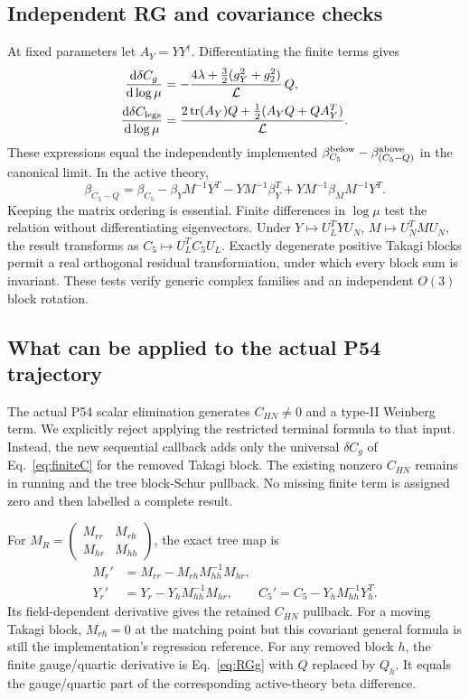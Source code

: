 \documentclass[11pt]{article}
\newcommand{\tr}{\operatorname{tr}}
\newcommand{\dd}{\mathrm d}
\newcommand{\LOOP}{\mathcal L}
\begin{document}
\subsection{Independent RG and covariance checks}
At fixed parameters let $A_Y=YY^\dagger$. Differentiating the finite
terms gives
\begin{align}
 \frac{\dd\delta C_g}{\dd\log\mu}
 &=-\frac{4\lambda+\tfrac32(g_Y^2+g_2^2)}{\LOOP}\,Q,\label{eq:RGg}\\
 \frac{\dd\delta C_{\rm legs}}{\dd\log\mu}
 &=\frac{2\tr(A_Y)Q+\tfrac12(A_YQ+QA_Y^T)}{\LOOP}.
 \label{eq:RGchecks}
\end{align}
These expressions equal the independently implemented
$\beta_{C_5}^{\rm below}-\beta_{(C_5-Q)}^{\rm above}$ in the canonical
limit. In the active theory,
\begin{equation}
 \beta_{C_5-Q}=\beta_{C_5}-\beta_YM^{-1}Y^T-YM^{-1}\beta_Y^T
                    +YM^{-1}\beta_M M^{-1}Y^T.
\end{equation}
Keeping the matrix ordering is essential. Finite differences in
$\log\mu$ test the relation without differentiating eigenvectors.
Under $Y\mapsto U_L^TYU_N$, $M\mapsto U_N^TMU_N$, the result transforms
as $C_5\mapsto U_L^TC_5U_L$. Exactly degenerate positive Takagi blocks
permit a real orthogonal residual transformation, under which every
block sum is invariant. These tests verify generic complex families
and an independent $O(3)$ block rotation.

\subsection{What can be applied to the actual P54 trajectory}
The actual P54 scalar elimination generates $C_{HN}\ne0$ and a type-II
Weinberg term. We explicitly reject applying the restricted terminal
formula to that input. Instead, the new sequential callback adds only
the universal $\delta C_g$ of Eq.~\eqref{eq:finiteC} for the removed
Takagi block. The existing nonzero $C_{HN}$ remains in running and the
tree block-Schur pullback. No missing finite term is assigned zero and
then labelled a complete result.

For $M_R=\left(\begin{smallmatrix}M_{rr}&M_{rh}\\M_{hr}&M_{hh}\end{smallmatrix}\right)$,
the exact tree map is
\begin{align}
 M_r'&=M_{rr}-M_{rh}M_{hh}^{-1}M_{hr},\\
 Y_r'&=Y_r-Y_hM_{hh}^{-1}M_{hr},\qquad
 C_5'=C_5-Y_hM_{hh}^{-1}Y_h^T.
\end{align}
Its field-dependent derivative gives the retained $C_{HN}$ pullback.
For a moving Takagi block, $M_{rh}=0$ at the matching point but this
covariant general formula is still the implementation's regression
reference. For any removed block $h$, the finite gauge/quartic derivative
is Eq.~\eqref{eq:RGg} with $Q$ replaced by $Q_h$. It equals the
gauge/quartic part of the corresponding active-theory beta difference.
\end{document}
